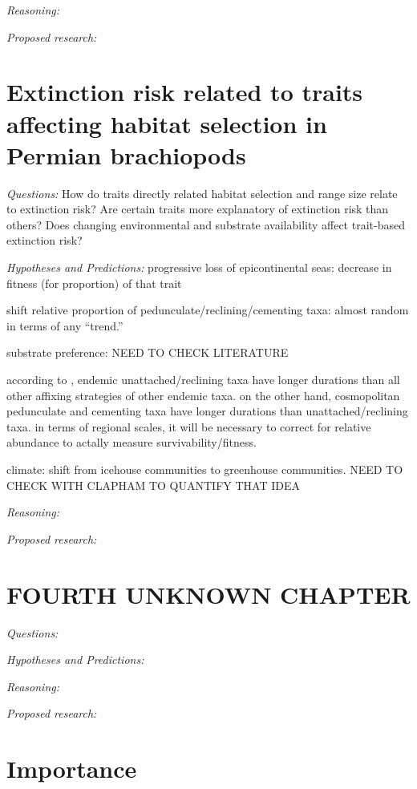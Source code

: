 \documentclass[12pt,letterpaper]{article}
\begin{document}
\textit{Reasoning:}

\textit{Proposed research:}


\section{Extinction risk related to traits affecting habitat selection in Permian brachiopods}

\textit{Questions:} How do traits directly related habitat selection and range size relate to extinction risk? Are certain traits more explanatory of extinction risk than others? Does changing environmental and substrate availability affect trait-based extinction risk?

\textit{Hypotheses and Predictions:}
progressive loss of epicontinental seas: decrease in fitness (for proportion) of that trait

shift relative proportion of pedunculate/reclining/cementing taxa: almost random \citep{Clapham2007} in terms of any ``trend.'' 

substrate preference: NEED TO CHECK LITERATURE

according to \citet{Alexander1977}, endemic unattached/reclining taxa have longer durations than all other affixing strategies of other endemic taxa. on the other hand, cosmopolitan pedunculate and cementing taxa have longer durations than unattached/reclining taxa. in terms of regional scales, it will be necessary to correct for relative abundance to actally measure survivability/fitness.

climate: shift from icehouse communities to greenhouse communities. NEED TO CHECK WITH CLAPHAM TO QUANTIFY THAT IDEA


\textit{Reasoning:}

\textit{Proposed research:}


\section{FOURTH UNKNOWN CHAPTER}

\textit{Questions:}

\textit{Hypotheses and Predictions:}

\textit{Reasoning:}

\textit{Proposed research:}


\section{Importance}
\end{document}

